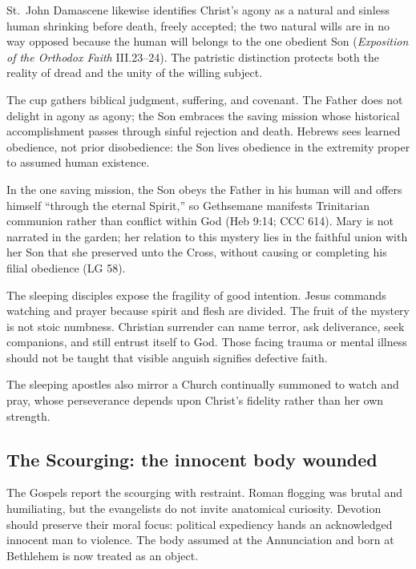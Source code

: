 St.~John Damascene likewise identifies Christ's agony as a natural and sinless human shrinking before death, freely accepted; the two natural wills are in no way opposed because the human will belongs to the one obedient Son (\emph{Exposition of the Orthodox Faith} III.23--24). The patristic distinction protects both the reality of dread and the unity of the willing subject.

The cup gathers biblical judgment, suffering, and covenant. The Father does not delight in agony as agony; the Son embraces the saving mission whose historical accomplishment passes through sinful rejection and death. Hebrews sees learned obedience, not prior disobedience: the Son lives obedience in the extremity proper to assumed human existence.

In the one saving mission, the Son obeys the Father in his human will and offers himself ``through the eternal Spirit,'' so Gethsemane manifests Trinitarian communion rather than conflict within God (Heb 9:14; CCC 614). Mary is not narrated in the garden; her relation to this mystery lies in the faithful union with her Son that she preserved unto the Cross, without causing or completing his filial obedience (LG 58).

The sleeping disciples expose the fragility of good intention. Jesus commands watching and prayer because spirit and flesh are divided. The fruit of the mystery is not stoic numbness. Christian surrender can name terror, ask deliverance, seek companions, and still entrust itself to God. Those facing trauma or mental illness should not be taught that visible anguish signifies defective faith.

The sleeping apostles also mirror a Church continually summoned to watch and pray, whose perseverance depends upon Christ's fidelity rather than her own strength.

\subsection{The Scourging: the innocent body wounded}


The Gospels report the scourging with restraint. Roman flogging was brutal and humiliating, but the evangelists do not invite anatomical curiosity. Devotion should preserve their moral focus: political expediency hands an acknowledged innocent man to violence. The body assumed at the Annunciation and born at Bethlehem is now treated as an object.

